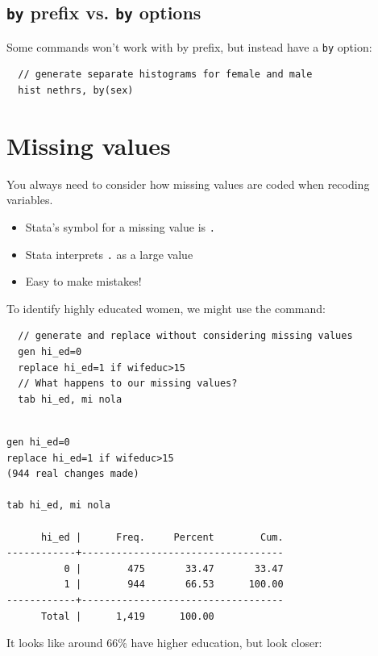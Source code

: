 \documentclass[]{book}
\providecommand{\tightlist}{%
  \setlength{\itemsep}{0pt}\setlength{\parskip}{0pt}}
\begin{document}
\subsection{\texorpdfstring{\texttt{by} prefix vs. \texttt{by}
options}{by prefix vs. by options}}\label{by-prefix-vs.-by-options}

Some commands won't work with by prefix, but instead have a \texttt{by}
option:

\begin{verbatim}
  // generate separate histograms for female and male 
  hist nethrs, by(sex)
\end{verbatim}

\section{Missing values}\label{missing-values}

You always need to consider how missing values are coded when recoding
variables.

\begin{itemize}
\tightlist
\item
  Stata's symbol for a missing value is \texttt{.}
\item
  Stata interprets \texttt{.} as a large value
\item
  Easy to make mistakes!
\end{itemize}

To identify highly educated women, we might use the command:

\begin{verbatim}
  // generate and replace without considering missing values
  gen hi_ed=0
  replace hi_ed=1 if wifeduc>15
  // What happens to our missing values?
  tab hi_ed, mi nola
\end{verbatim}

\begin{verbatim}

gen hi_ed=0
replace hi_ed=1 if wifeduc>15
(944 real changes made)

tab hi_ed, mi nola

      hi_ed |      Freq.     Percent        Cum.
------------+-----------------------------------
          0 |        475       33.47       33.47
          1 |        944       66.53      100.00
------------+-----------------------------------
      Total |      1,419      100.00
\end{verbatim}

It looks like around 66\% have higher education, but look closer:
\end{document}
